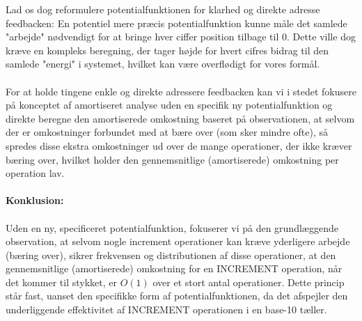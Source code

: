 \documentclass{article}
\begin{document}
Lad os dog reformulere potentialfunktionen for klarhed og direkte adresse feedbacken: En potentiel mere præcis potentialfunktion kunne måle det samlede "arbejde" nødvendigt for at bringe hver ciffer position tilbage til 0. Dette ville dog kræve en kompleks beregning, der tager højde for hvert cifres bidrag til den samlede "energi" i systemet, hvilket kan være overflødigt for vores formål.
\\
\\
For at holde tingene enkle og direkte adressere feedbacken kan vi i stedet fokusere på konceptet af amortiseret analyse uden en specifik ny potentialfunktion og direkte beregne den amortiserede omkostning baseret på observationen, at selvom der er omkostninger forbundet med at bære over (som sker mindre ofte), så spredes disse ekstra omkostninger ud over de mange operationer, der ikke kræver bæring over, hvilket holder den gennemsnitlige (amortiserede) omkostning per operation lav.
\\
\\
\textbf{Konklusion:}
\\
\\
Uden en ny, specificeret potentialfunktion, fokuserer vi på den grundlæggende observation, at selvom nogle increment operationer kan kræve yderligere arbejde (bæring over), sikrer frekvensen og distributionen af disse operationer, at den gennemsnitlige (amortiserede) omkostning for en INCREMENT operation, når det kommer til stykket, er $O(1)$ over et stort antal operationer. Dette princip står fast, uanset den specifikke form af potentialfunktionen, da det afspejler den underliggende effektivitet af INCREMENT operationen i en base-10 tæller.
\end{document}
